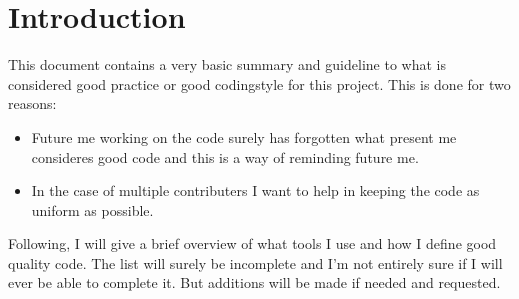 \section{Introduction}
This document contains a very basic summary and guideline to what is considered
{\glqq good practice\grqq} or {\glqq good codingstyle\grqq} for this project.
This is done for two reasons:

\begin{itemize}
    \item Future me working on the code surely has forgotten what present me
        consideres good code and this is a way of reminding future me.
    \item In the case of multiple contributers I want to help in keeping the
        code as uniform as possible.
\end{itemize}

Following, I will give a brief overview of what tools I use and how I define
good quality code. The list will surely be incomplete and I'm not entirely sure
if I will ever be able to complete it. But additions will be made if needed and
requested.

